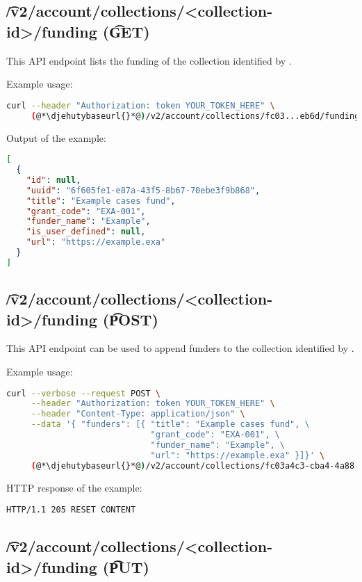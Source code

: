 \subsection{\t{/v2/account/collections/<collection-id>/funding} (\t{GET})}

  This API endpoint lists the funding of the collection identified by .

  Example usage:
\begin{lstlisting}[language=bash]
curl --header "Authorization: token YOUR_TOKEN_HERE" \
     (@*\djehutybaseurl{}*@)/v2/account/collections/fc03...eb6d/funding | jq
\end{lstlisting}

  Output of the example:
\begin{lstlisting}[language=JSON]
[
  {
    "id": null,
    "uuid": "6f605fe1-e87a-43f5-8b67-70ebe3f9b868",
    "title": "Example cases fund",
    "grant_code": "EXA-001",
    "funder_name": "Example",
    "is_user_defined": null,
    "url": "https://example.exa"
  }
]
\end{lstlisting}

\subsection{\t{/v2/account/collections/<collection-id>/funding} (\t{POST})}
\label{sec:api-v2-collections-funding-post}

  This API endpoint can be used to append funders to the collection identified
  by \code{collection-id}.

  Example usage:
\begin{lstlisting}[language=bash]
curl --verbose --request POST \
     --header "Authorization: token YOUR_TOKEN_HERE" \
     --header "Content-Type: application/json" \
     --data '{ "funders": [{ "title": "Example cases fund", \
                             "grant_code": "EXA-001", \
                             "funder_name": "Example", \
                             "url": "https://example.exa" }]}' \
     (@*\djehutybaseurl{}*@)/v2/account/collections/fc03a4c3-cba4-4a88-a8a6-eb38924eeb6d/funding
\end{lstlisting}

  HTTP response of the example:
\begin{lstlisting}
HTTP/1.1 205 RESET CONTENT
\end{lstlisting}

\subsection{\t{/v2/account/collections/<collection-id>/funding} (\t{PUT})}

